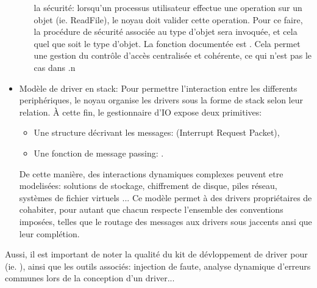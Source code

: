 \begin{correction}
\begin{itemize}
\begin{itemize}
      la s\'{e}curit\'{e}: lorsqu'un processus utilisateur effectue une operation sur
      un objet (ie. ReadFile), le noyau doit valider cette operation. Pour ce faire,
      la proc\'{e}dure de s\'{e}curit\'{e} associ\'{e}e au type d'objet sera invoqu\'{e}e,
      et cela quel que soit le type d'objet. La fonction document\'{e}e est
      . Cela permet une gestion du contr\^{o}le d'acc\`{e}s
      centralis\'{e}e et coh\'{e}rente, ce qui n'est pas le cas dans .n
    \end{itemize}
  \item
    Mod\`{e}le de driver en stack: Pour permettre l'interaction entre les differents
    periph\'{e}riques, le noyau organise les drivers sous la forme de stack selon leur
    relation. \`{A} cette fin, le gestionnaire d'IO expose deux primitives:
    \begin{itemize}
      \item
      Une structure d\'{e}crivant les messages:  (Interrupt Request Packet),
      \item
      Une fonction de message passing: .
    \end{itemize}
    De cette mani\`{e}re, des interactions dynamiques complexes peuvent etre modelis\'{e}es:
    solutions de stockage, chiffrement de disque, piles r\'{e}seau, syst\`{e}mes de fichier
    virtuels ...
    Ce mod\`{e}le permet \`{a} des drivers propri\'{e}taires de cohabiter, pour autant que
    chacun respecte l'ensemble des conventions impos\'{e}es, telles que le routage des
    messages aux drivers sous jaccents ansi que leur compl\'{e}tion.
\end{itemize}

Aussi, il est important de noter la qualit\'{e} du kit de d\'{e}vloppement de driver pour
 (ie. ), ainsi que les outils associ\'{e}s: injection de
faute, analyse dynamique d'erreurs communes lors de la conception d'un driver...

\end{correction}


